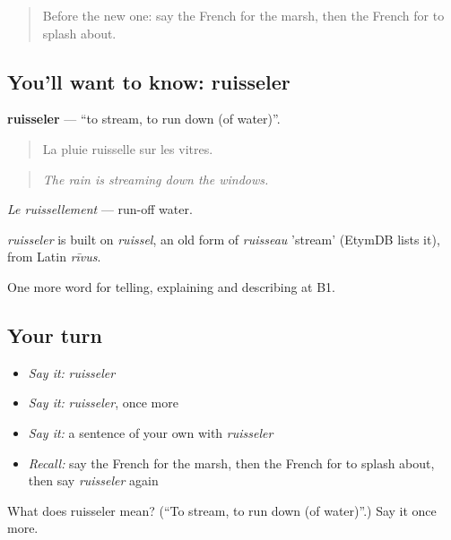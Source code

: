 \label{lesson:FR-C456-ruisseler}



\begin{quote}
Before the new one: say the French for the marsh, then the French for to splash about.
\end{quote}

\subsection*{You'll want to know: ruisseler}
\textbf{ruisseler} — \textquotedblleft{}to stream, to run down (of water)\textquotedblright{}.

\begin{quote}
La pluie ruisselle sur les vitres.
\end{quote}

\begin{quote}
\emph{The rain is streaming down the windows.}
\end{quote}

\emph{Le ruissellement} — run-off water.

\begin{cousinweb}
\emph{ruisseler} is built on \emph{ruissel}, an old form of \emph{ruisseau} 'stream' (EtymDB lists it), from Latin \emph{rīvus}.
\end{cousinweb}

\begin{grammarlens}[title={What you've built}]
One more word for telling, explaining and describing at B1.
\end{grammarlens}

\subsection*{Your turn}
\begin{itemize}
\raggedright
  \item \emph{Say it:} \emph{ruisseler}
  \item \emph{Say it:} \emph{ruisseler}, once more
  \item \emph{Say it:} a sentence of your own with \emph{ruisseler}
  \item \emph{Recall:} say the French for the marsh, then the French for to splash about, then say \emph{ruisseler} again
\end{itemize}

\begin{tcolorbox}[breakable,colback=teal!4,colframe=teal!35!black,title={Before you move on}]
What does ruisseler mean? (\textquotedblleft{}To stream, to run down (of water)\textquotedblright{}.) Say it once more.
\end{tcolorbox}
